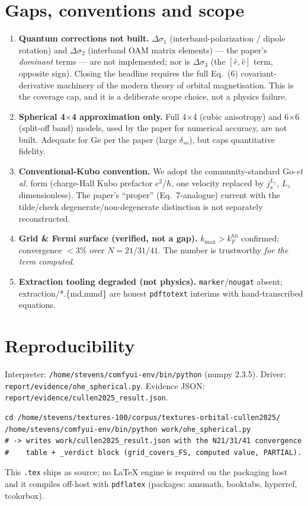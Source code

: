 \documentclass[11pt]{article}
\begin{document}
\section{Gaps, conventions and scope}
\begin{enumerate}
\item \textbf{Quantum corrections not built.} $\Delta\sigma_1$ (interband-polarization / dipole
rotation) and $\Delta\sigma_2$ (interband OAM matrix elements) --- the paper's \emph{dominant} terms
--- are not implemented; nor is $\Delta\sigma_3$ (the $[\hat r,\hat v]$ term, opposite sign). Closing
the headline requires the full Eq.~(6) covariant-derivative machinery of the modern theory of orbital
magnetisation. This is the coverage cap, and it is a deliberate scope choice, not a physics failure.
\item \textbf{Spherical 4$\times$4 approximation only.} Full 4$\times$4 (cubic anisotropy) and 6$\times$6
(split-off band) models, used by the paper for numerical accuracy, are not built. Adequate for Ge
per the paper (large $\delta_{so}$), but caps quantitative fidelity.
\item \textbf{Conventional-Kubo convention.} We adopt the community-standard Go-\emph{et al.} form
(charge-Hall Kubo prefactor $e^2/\hbar$, one velocity replaced by $j^{L_z}_x$, $L_z$ dimensionless).
The paper's ``proper'' (Eq.~7-analogue) current with the tilde/check degenerate/non-degenerate
distinction is not separately reconstructed.
\item \textbf{Grid \& Fermi surface (verified, not a gap).} $k_{\max}>k_F^{hh}$ confirmed; convergence
$<3\%$ over $N=21/31/41$. The number is trustworthy \emph{for the term computed}.
\item \textbf{Extraction tooling degraded (not physics).} \texttt{marker}/\texttt{nougat} absent;
extraction/*.\{md,mmd\} are honest \texttt{pdftotext} interims with hand-transcribed equations.
\end{enumerate}

\section{Reproducibility}
Interpreter: \texttt{/home/stevens/comfyui-env/bin/python} (numpy 2.3.5). Driver:
\texttt{report/evidence/ohe\_spherical.py}. Evidence JSON:
\texttt{report/evidence/cullen2025\_result.json}.
\begin{verbatim}
cd /home/stevens/textures-100/corpus/textures-orbital-cullen2025/
/home/stevens/comfyui-env/bin/python work/ohe_spherical.py
# -> writes work/cullen2025_result.json with the N21/31/41 convergence
#    table + _verdict block (grid_covers_FS, computed value, PARTIAL).
\end{verbatim}
This \texttt{.tex} ships as source; no LaTeX engine is required on the packaging host and it compiles
off-host with \texttt{pdflatex} (packages: amsmath, booktabs, hyperref, tcolorbox).
\end{document}
